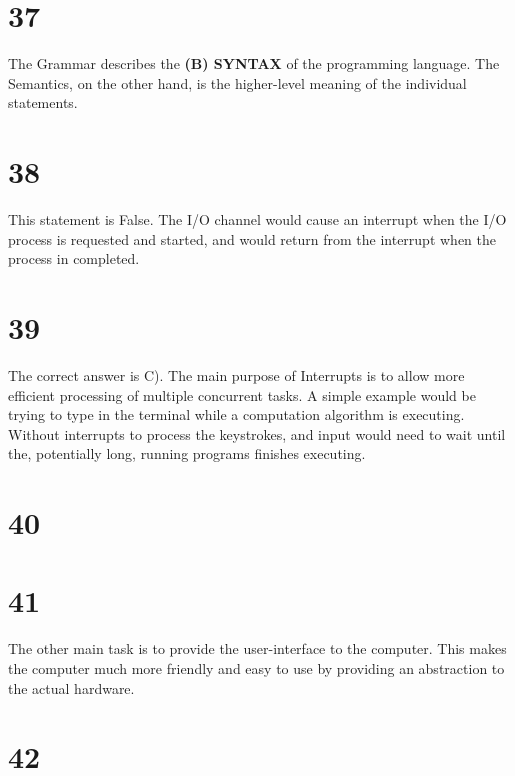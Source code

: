 \documentclass[a4paper,11pt]{article}
\begin{document}

\section*{37}
The Grammar describes the {\bf (B) SYNTAX} of the programming language.  The Semantics, on the other hand, is the higher-level meaning of the individual statements.  


\section*{38}
This statement is False.  The I/O channel would cause an interrupt when the I/O process is requested and started, and would return from the interrupt when the process in completed.


\section*{39}
The correct answer is C).   The main purpose of Interrupts is to allow more efficient processing of multiple concurrent tasks.  A simple example would be trying to type in the terminal while a computation algorithm is executing.  Without interrupts to process the keystrokes, and input would need to wait until the, potentially long, running programs finishes executing. 


\section*{40}


\section*{41}
The other main task is to provide the user-interface to the computer.  This makes the computer much more friendly and easy to use by providing an abstraction to the actual hardware.  


\section*{42}
\end{document}
